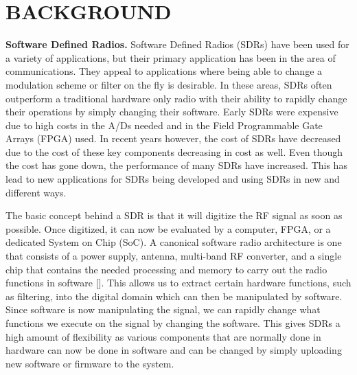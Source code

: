 \chapter{BACKGROUND}




\textbf{Software Defined Radios.} Software Defined Radios (SDRs) have been used for a variety of applications, but their primary application has been in the area of communications.  They appeal to applications where being able to change a modulation scheme or filter on the fly is desirable.  In these areas, SDRs often outperform a traditional hardware only radio with their ability to rapidly change their operations by simply changing their software.  Early SDRs were expensive due to high costs in the A/Ds needed and in the Field Programmable Gate Arrays (FPGA) used.  In recent years however, the cost of SDRs have decreased due to the cost of these key components decreasing in cost as well.  Even though the cost has gone down, the performance of many SDRs have increased.  This has lead to new applications for SDRs being developed and using SDRs in new and different ways.

The basic concept behind a SDR is that it will digitize the RF signal as soon as possible.  Once digitized, it can now be evaluated by a computer, FPGA, or a dedicated System on Chip (SoC).  A canonical software radio architecture is one that consists of a power supply, antenna, multi-band RF converter, and a single chip that contains the needed processing and memory to carry out the radio functions in software [\cite{Mitola1995}].  This allows us to extract certain hardware functions, such as filtering, into the digital domain which can then be manipulated by software.  Since software is now manipulating the signal, we can rapidly change what functions we execute on the signal by changing the software.  This gives SDRs a high amount of flexibility as various components that are normally done in hardware can now be done in software and can be changed by simply uploading new software or firmware to the system.  

